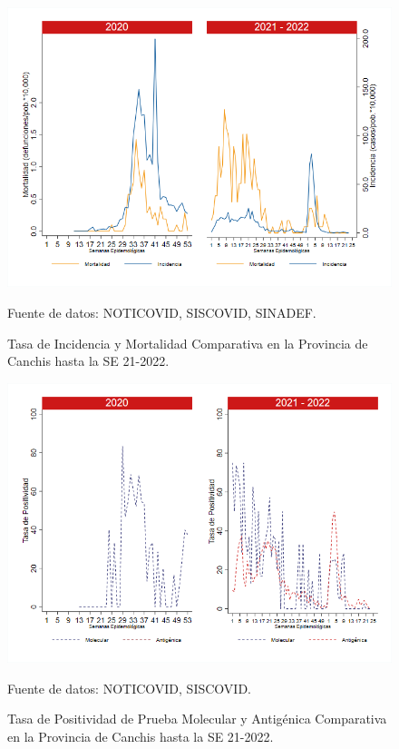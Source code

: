 \documentclass[12pt,a4paper,openany]{book}
\begin{document}
	\begin{figure}[h]
		\caption{Tasa de Incidencia y Mortalidad Comparativa en la Provincia de Canchis hasta la SE 21-2022.}\label{fig:inc_mort_canchis}
		\begin{center}
			\includegraphics[width=0.85\linewidth]{../figuras/incidencia_mortalidad_20_21_5.png}
		\end{center}
		{\footnotesize {Fuente de datos: NOTICOVID, SISCOVID, SINADEF.}}
	\end{figure}
	
	\begin{figure}[h]
		\caption{Tasa de Positividad de Prueba Molecular y Antigénica Comparativa en la Provincia de Canchis hasta la SE 21-2022.}\label{fig:positividad_canchis}
		\begin{center}
			\includegraphics[width=0.7\linewidth]{../figuras/positividad_20_21_5.png}
		\end{center}
		{\footnotesize {Fuente de datos: NOTICOVID, SISCOVID.}}
	\end{figure}
	
\end{document}
